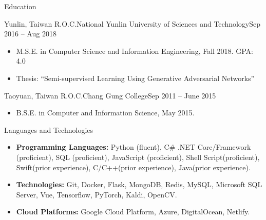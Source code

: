 \documentclass[]{mcdowellcv}
\begin{document}
	\begin{cvsection}{Education}
		\begin{cvsubsection}{Yunlin, Taiwan R.O.C.}{National Yunlin University of Sciences and Technology}{Sep 2016 -- Aug 2018}
			\bigskip
			\begin{itemize}
				\item M.S.E. in Computer Science and Information Engineering, Fall 2018.  GPA: 4.0
				\item Thesis: “Semi-supervised Learning Using Generative Adversarial Networks”
			\end{itemize}
		\end{cvsubsection}
		\begin{cvsubsection}{Taoyuan, Taiwan R.O.C.}{Chang Gung College}{Sep 2011 -- June 2015}
			\begin{itemize}
				\item B.S.E. in Computer and Information Science, May 2015. 
			\end{itemize}
		\end{cvsubsection}
	\end{cvsection}

	\begin{cvsection}{Languages and Technologies}
		\begin{cvsubsection}{}{}{}	
			\begin{itemize}
				\item \textbf{Programming Languages:}  Python (fluent), C\# .NET Core/Framework (proficient), SQL (proficient), JavaScript (proficient), Shell Script(proficient), Swift(prior experience), C/C++(prior experience), Java(prior experience).
				\item \textbf{Technologies:}  Git, Docker, Flask, MongoDB, Redis, MySQL, Microsoft SQL Server, Vue, Tensorflow, PyTorch, Kaldi, OpenCV.
				\item \textbf{Cloud Platforms:}  Google Cloud Platform, Azure, DigitalOcean, Netlify.
			\end{itemize}
		\end{cvsubsection}
	\end{cvsection}
	
\end{document}
